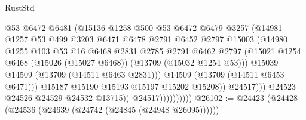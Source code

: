 \begin{lexlean}{RustStd}
\begin{coremodule}
                                    @53
                                    @6472
                                    @6481
                                    (@15136
                                      @1258
                                      @500
                                      @53
                                      @6472
                                      @6479
                                      @3257
                                      (@14981
                                        @1257
                                        @53
                                        @499
                                        @3203
                                        @6471
                                        @6478
                                        @2791
                                        @6452
                                        @2797
                                        @15003
                                        (@14980
                                          @1255
                                          @103
                                          @53
                                          @16
                                          @6468
                                          @2831
                                          @2785
                                          @2791
                                          @6462
                                          @2797
                                          (@15021
                                            @1254
                                            @6468
                                            (@15026 (@15027 @6468))
                                            (@13709 (@15032 @1254 @53)))
                                          @15039
                                          @14509
                                          (@13709 (@14511 @6463 @2831)))
                                        @14509
                                        (@13709 (@14511 @6453 @6471)))
                                      @15187
                                      @15190
                                      @15193
                                      @15197
                                      @15202
                                      @15208))
                                  @24517)))
                            @24523
                            @24526
                            @24529
                            @24532
                            @13715))
                        @24517))))))))))
@26102 := @24423 (@24428 (@24536 (@24639 (@24742 (@24845 (@24948 @26095))))))

\end{coremodule}
\end{lexlean}

